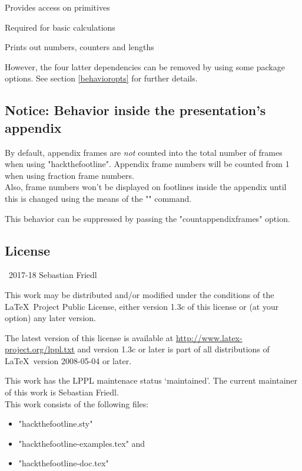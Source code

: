 \documentclass[11pt]{ltxdoc}
\begin{document}
	\medskip
	Provides access on  primitives
	
	\medskip
	Required for basic calculations

	\medskip
	Prints out numbers, counters and lengths
	
	\bigskip
	However, the four latter dependencies can be removed by using some package options. See section \ref{behavioropts} for further details.
	
	
	\subsection*{Notice: Behavior inside the presentation's appendix}
	By default, appendix frames are \emph{not} counted into the total number of frames when using "hackthefootline". Appendix frame numbers will be counted from 1 when using fraction frame numbers. \\
	Also, frame numbers won't be displayed on footlines inside the appendix until this is changed using the means of the "\htfconfig" command.
	
	\medskip
	This behavior can be suppressed by passing the "countappendixframes" option.
	
	
	\subsection*{License}
	\textcopyright\ 2017-18 Sebastian Friedl
	
	\smallskip
	This work may be distributed and/or modified under the conditions of the \LaTeX\ Project Public License, either version 1.3c of this license or (at your option) any later version.
	
	\smallskip
	The latest version of this license is available at \url{http://www.latex-project.org/lppl.txt} and version 1.3c or later is part of all distributions of \LaTeX\ version 2008-05-04 or later.
	
	\smallskip
	This work has the LPPL maintenace status \enquote*{maintained}. The current maintainer of this work is Sebastian Friedl. \\
	This work consists of the following files:
	\begin{itemize} \itemsep 0pt
		\item "hackthefootline.sty"
		\item "hackthefootline-examples.tex" and
		\item "hackthefootline-doc.tex"
	\end{itemize}
	
\end{document}
